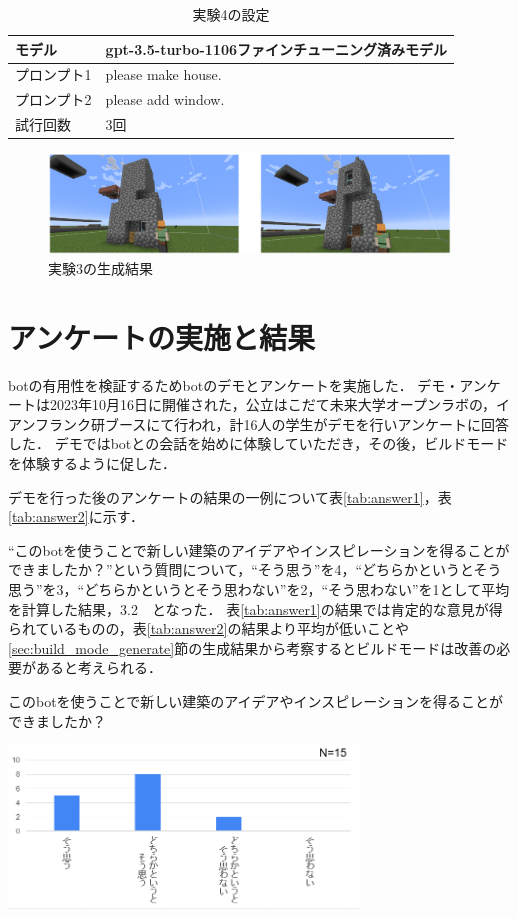 \begin{table}[H]
    \caption{実験4の設定}\label{tab:setting4}
    \centering
    \begin{tabular}{ll}
        \hline \hline
        モデル & gpt-3.5-turbo-1106ファインチューニング済みモデル \\
        \hline
        プロンプト1 & please make house. \\
        \hline
        プロンプト2 & please add window. \\
        \hline
        試行回数 & 3回 \\
        \hline
    \end{tabular}
\end{table}

\begin{figure}[H]
    \centering
    \includegraphics[width=0.95\textwidth]{fig/add_window2.PNG}
    \caption{実験3の生成結果}
    \label{fig:add_window2}
\end{figure}

\section{アンケートの実施と結果}
botの有用性を検証するためbotのデモとアンケートを実施した．
デモ・アンケートは2023年10月16日に開催された，公立はこだて未来大学オープンラボの，イアンフランク研ブースにて行われ，計16人の学生がデモを行いアンケートに回答した．
デモではbotとの会話を始めに体験していただき，その後，ビルドモードを体験するように促した．

デモを行った後のアンケートの結果の一例について表\ref{tab:answer1}，表\ref{tab:answer2}に示す．

``このbotを使うことで新しい建築のアイデアやインスピレーションを得ることができましたか？''という質問について，``そう思う''を4，``どちらかというとそう思う''を3，``どちらかというとそう思わない''を2，``そう思わない''を1として平均を計算した結果，3.2　となった．
表\ref{tab:answer1}の結果では肯定的な意見が得られているものの，表\ref{tab:answer2}の結果より平均が低いことや\ref{sec:build_mode_generate}節の生成結果から考察するとビルドモードは改善の必要があると考えられる．
\begin{table}[H]
    \centering
    \caption{このbotを使うことで新しい建築のアイデアやインスピレーションを得ることができましたか？}
    \label{tab:answer1}
    \includegraphics[width=0.7\textwidth]{fig/tab2.png}
\end{table}

